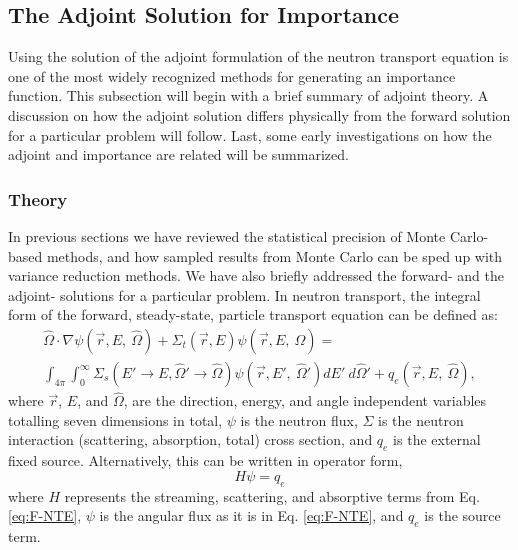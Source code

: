 \subsection{The Adjoint Solution for Importance}
\label{sec:AdjointImportance}

Using the solution of the adjoint formulation of the neutron transport
equation is one of the most widely recognized methods for generating
an importance function. This subsection will begin with a brief summary of
adjoint theory. A discussion on how
the adjoint solution differs physically from the forward solution for a
particular problem will follow. Last, some early investigations on how the
adjoint
and importance are related will be summarized.

\subsubsection{Theory}

In previous sections we have reviewed the statistical precision of Monte
Carlo-based methods, and how sampled results from Monte Carlo can be sped up
with variance reduction methods. We have also briefly addressed the forward- and
the adjoint- solutions for a particular problem. In neutron transport, the
integral form of the forward, steady-state, particle transport equation can be
defined as:
\begin{multline}
\hat\Omega \cdot \nabla \psi
        (\vec {r} ,E,\:\hat\Omega)+\Sigma _{ t }
        (\vec{r},E)\psi (\vec { r } ,E,\:\hat\Omega) = \\
        \int _{ 4\pi  } \int _{ 0 }^{ \infty  } \Sigma _{ s }(E'\rightarrow E,
        \hat\Omega'\rightarrow\hat\Omega)\psi (\vec { r } ,E',\: \hat\Omega')dE'
        \:d\hat\Omega' + q_{e}(\vec { r } ,E, \:\hat\Omega),
\label{eq:F-NTE}
\end{multline}
where $\vec { r }$, $E$, and $\hat\Omega$, are the direction, energy, and angle
independent variables totalling seven dimensions in total,
$\psi$ is the neutron flux, $\Sigma$ is the neutron
interaction (scattering, absorption, total) cross section, and $q_{e}$ is the
external fixed source. Alternatively, this can be written in operator form,
\begin{equation}
  H \psi = q_{e}
\label{eq:F-NTE2}
\end{equation}
where $H$ represents the streaming, scattering, and absorptive terms from Eq.
\eqref{eq:F-NTE}, $\psi$ is the angular flux as it is in Eq. \eqref{eq:F-NTE}, and
$q_{e}$ is the source term.


